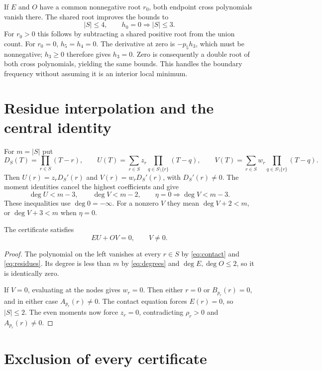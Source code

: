 \documentclass[11pt]{article}
\begin{document}
If $E$ and $O$ have a common nonnegative root $r_0$, both endpoint cross polynomials vanish there. The shared root improves the bounds to
\begin{equation}\label{eq:sharedcounts}
 |S|\le4,\qquad h_0=0\Longrightarrow |S|\le3.
\end{equation}
For $r_0>0$ this follows by subtracting a shared positive root from the union count. For $r_0=0$, $h_5=h_4=0$. The derivative at zero is $-p_5h_3$, which must be nonnegative; $h_3\ge0$ therefore gives $h_3=0$. Zero is consequently a double root of both cross polynomials, yielding the same bounds. This handles the boundary frequency without assuming it is an interior local minimum.

\section{Residue interpolation and the central identity}
For $m=|S|$ put
\[
 D_S(T)=\prod_{r\in S}(T-r),\qquad
 U(T)=\sum_{r\in S}z_r\prod_{q\in S\setminus\{r\}}(T-q),\qquad
 V(T)=\sum_{r\in S}w_r\prod_{q\in S\setminus\{r\}}(T-q).
\]
Then $U(r)=z_rD_S'(r)$ and $V(r)=w_rD_S'(r)$, with $D_S'(r)\ne0$. The moment identities cancel the highest coefficients and give
\begin{equation}\label{eq:degrees}
 \deg U<m-3,\qquad\deg V<m-2,\qquad
 \eta=0\Longrightarrow\deg V<m-3.
\end{equation}
These inequalities use $\deg0=-\infty$. For a nonzero $V$ they mean $\deg V+2<m$, or $\deg V+3<m$ when $\eta=0$.

\begin{lemma}\label{lem:identity}
The certificate satisfies
\begin{equation}\label{eq:identity}
 EU+OV=0,\qquad V\ne0.
\end{equation}
\end{lemma}
\begin{proof}
The polynomial on the left vanishes at every $r\in S$ by \eqref{eq:contact} and \eqref{eq:residues}. Its degree is less than $m$ by \eqref{eq:degrees} and $\deg E,\deg O\le2$, so it is identically zero.

If $V=0$, evaluating at the nodes gives $w_r=0$. Then either $r=0$ or $B_{p_r}(r)=0$, and in either case $A_{p_r}(r)\ne0$. The contact equation forces $E(r)=0$, so $|S|\le2$. The even moments now force $z_r=0$, contradicting $\rho_r>0$ and $A_{p_r}(r)\ne0$.
\end{proof}

\section{Exclusion of every certificate}
\end{document}
